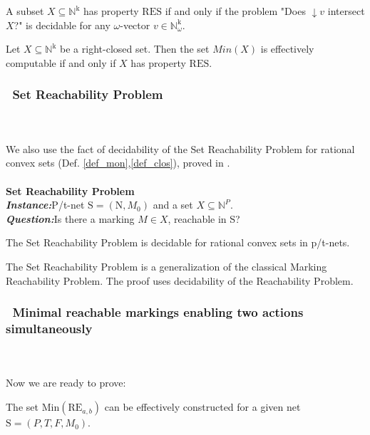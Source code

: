 \documentclass[a4paper]{llncs}
\begin{document}
\begin{definition}
A subset $X\subseteq \mathbb{N}^\mathrm{k}$ has property $\mathrm{RES}$  if and only if the problem "Does  $\downarrow v$ intersect $X$?" is decidable for any  $\omega$-vector $v\in \mathbb{N}_\omega^\mathrm{k}$.
\end{definition}

\begin{theorem}
\label{twValk}
Let $X\subseteq \mathbb{N}^\mathrm{k}$ be a right-closed set. Then the set $Min(X)$ is effectively computable if and only if $X$ has property $\mathrm{RES}$.
\end{theorem}

\subsubsection{\textbullet \ Set Reachability Problem}\mbox{ }\\
\\
We also use the fact of decidability of the Set Reachability Problem for rational convex sets (Def. \ref{def_mon},\ref{def_clos}), proved in  \cite{BarOch}.
\\ \\
\textbf{Set Reachability Problem}
\\
\indent\textbf{\emph{Instance:}}P/t-net $\mathrm{S}=(\mathrm{N}, M_0)$ and a set $X\subseteq\mathbb{N}^{P}$.\\
\indent\textbf{\emph{Question:}}Is there a marking $M\in X$, reachable in S? \\

\begin{theorem}
\label{tplus}
The Set Reachability Problem is decidable for rational convex sets in p/t-nets.
\end{theorem}
The Set Reachability Problem is a generalization of the classical Marking Reachability Problem. The proof uses decidability of the Reachability Problem.
\subsubsection{\textbullet \ Minimal reachable markings enabling two actions simultaneously}\mbox{ }\\ 
\\
Now we are ready to prove:

\begin{proposition}
\label {p414}
The set $\mathrm{Min}(\mathrm{RE}_{a,b})$ can be effectively constructed for a given net  $\mathrm{S}=(P,T,F,M_0)$.
\end{proposition}
\end{document}
